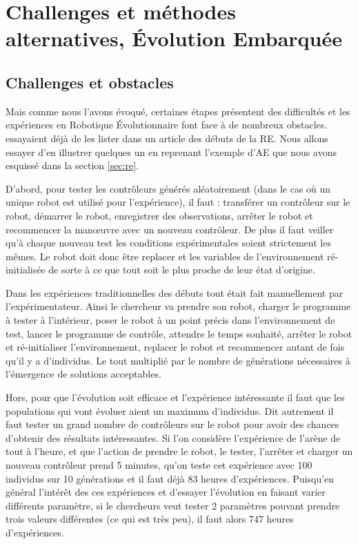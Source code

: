 \section{Challenges et méthodes alternatives, \'Evolution Embarquée}\label{sec:RE:EE}
\subsection{Challenges et obstacles}\label{sec:RE:EE:obs}
Mais comme nous l'avons évoqué, certaines étapes présentent des difficultés et les expériences en Robotique \'Evolutionnaire font face à de nombreux obstacles. \cite{mataric96challengesinevolvingcontrollersforphysicalrobots} essayaient déjà de les lister dans un article des débuts de la RE. Nous allons essayer d'en illustrer quelques un en reprenant l'exemple d'AE que nous avons esquissé dans la section \ref{sec:re}.

D'abord, pour tester les contrôleurs générés aléatoirement (dans le cas où un unique robot est utilisé pour l'expérience), il faut : transférer un contrôleur sur le robot, démarrer le robot, enregistrer des observations, arrêter le robot et recommencer la manœuvre avec un nouveau contrôleur. De plus il faut veiller qu'à chaque nouveau test les conditions expérimentales soient strictement les mêmes. Le robot doit donc être replacer et les variables de l'environnement ré-initialisée de sorte à ce que tout soit le plus proche de leur état d'origine.

Dans les expériences traditionnelles des débuts tout était fait manuellement par l'expérimentateur. Ainsi le chercheur va prendre son robot, charger le programme à tester à l'intérieur, poser le robot à un point précis dans l'environnement de test, lancer le programme de contrôle, attendre le temps souhaité, arrêter le robot et ré-initialiser l'environnement, replacer le robot et recommencer autant de fois qu'il y a d'individus. Le tout multiplié par le nombre de générations nécessaires à l'émergence de solutions acceptables.

Hors, pour que l'évolution soit efficace et l'expérience intéressante il faut que les populations qui vont évoluer aient un maximum d'individus. Dit autrement il faut tester un grand nombre de contrôleurs sur le robot pour avoir des chances d'obtenir des résultats intéressantes. Si l'on considère l'expérience de l'arène de tout à l'heure, et que l'action de prendre le robot, le tester, l'arrêter et charger un nouveau contrôleur prend 5 minutes, qu'on teste cet expérience avec 100 individus sur 10 générations et il faut déjà 83 heures d'expériences. Puisqu'en général l'intérêt des ces expériences et d'essayer l'évolution en faisant varier différents paramètre, si le chercheurs veut tester 2 paramètres pouvant prendre trois valeurs différentes (ce qui est très peu), il faut alors 747 heures d'expériences.

